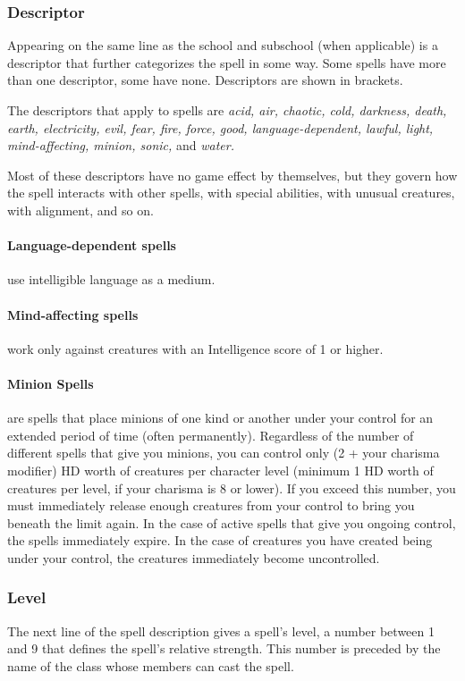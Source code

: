\subsubsection{Descriptor}
Appearing on the same line as the school and subschool (when applicable) is a descriptor that further categorizes the spell in some way. 
Some spells have more than one descriptor, some have none. Descriptors are shown in brackets.

The descriptors that apply to spells are 
\emph{acid, air, chaotic, cold, darkness, death, earth, electricity, evil, fear, fire, force, good, language-dependent, lawful, light, mind-affecting, minion, sonic,} and \emph{water.} 

Most of these descriptors have no game effect by themselves, but they govern how the spell interacts with other spells, with special abilities, with unusual creatures, with alignment, and so on.

\paragraph{Language-dependent spells} use intelligible language as a medium.

\paragraph{Mind-affecting spells} work only against creatures with an Intelligence score of 1 or higher.

\paragraph[Minion]{Minion Spells} 
\label{sec:MinionSpells}
are spells that place minions of one kind or another under your control for an extended period of 
time (often permanently).
Regardless of the number of different spells that give you minions, you can control only (2 + your charisma modifier) HD worth of creatures per character level (minimum 1 HD worth of creatures per level, if your charisma is 8 or lower). 
If you exceed this number, you must immediately release enough creatures from your control to bring you beneath the limit again.
In the case of active spells that give you ongoing control, the spells immediately expire.
In the case of creatures you have created being under your control, the creatures immediately become uncontrolled.
\subsubsection{Level}
The next line of the spell description gives a spell's level, a number between 1 and 9 that defines the spell's relative strength. 
This number is preceded by the name of the class whose members can cast the spell.
